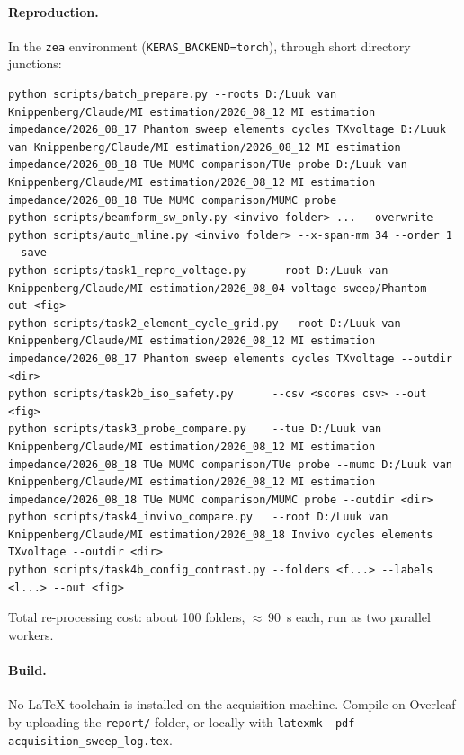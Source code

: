 \documentclass[11pt,a4paper]{article}
\begin{document}
\paragraph{Reproduction.} In the \texttt{zea} environment
(\texttt{KERAS\_BACKEND=torch}), through short directory junctions:
\begin{verbatim}
python scripts/batch_prepare.py --roots D:/Luuk van Knippenberg/Claude/MI estimation/2026_08_12 MI estimation impedance/2026_08_17 Phantom sweep elements cycles TXvoltage D:/Luuk van Knippenberg/Claude/MI estimation/2026_08_12 MI estimation impedance/2026_08_18 TUe MUMC comparison/TUe probe D:/Luuk van Knippenberg/Claude/MI estimation/2026_08_12 MI estimation impedance/2026_08_18 TUe MUMC comparison/MUMC probe
python scripts/beamform_sw_only.py <invivo folder> ... --overwrite
python scripts/auto_mline.py <invivo folder> --x-span-mm 34 --order 1 --save
python scripts/task1_repro_voltage.py    --root D:/Luuk van Knippenberg/Claude/MI estimation/2026_08_04 voltage sweep/Phantom --out <fig>
python scripts/task2_element_cycle_grid.py --root D:/Luuk van Knippenberg/Claude/MI estimation/2026_08_12 MI estimation impedance/2026_08_17 Phantom sweep elements cycles TXvoltage --outdir <dir>
python scripts/task2b_iso_safety.py      --csv <scores csv> --out <fig>
python scripts/task3_probe_compare.py    --tue D:/Luuk van Knippenberg/Claude/MI estimation/2026_08_12 MI estimation impedance/2026_08_18 TUe MUMC comparison/TUe probe --mumc D:/Luuk van Knippenberg/Claude/MI estimation/2026_08_12 MI estimation impedance/2026_08_18 TUe MUMC comparison/MUMC probe --outdir <dir>
python scripts/task4_invivo_compare.py   --root D:/Luuk van Knippenberg/Claude/MI estimation/2026_08_18 Invivo cycles elements TXvoltage --outdir <dir>
python scripts/task4b_config_contrast.py --folders <f...> --labels <l...> --out <fig>
\end{verbatim}
Total re-processing cost: about 100 folders, $\approx$\,\SI{90}{\second} each, run as two parallel
workers.

\paragraph{Build.} No LaTeX toolchain is installed on the acquisition machine. Compile on Overleaf by
uploading the \texttt{report/} folder, or locally with \texttt{latexmk -pdf acquisition\_sweep\_log.tex}.
\end{document}
